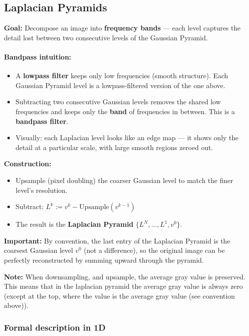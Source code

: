\documentclass{article}
\begin{document}
\subsection{Laplacian Pyramids}
\label{subsec:laplacian-pyramid}
\textbf{Goal:} Decompose an image into \textbf{frequency bands} — each level
captures the detail lost between two consecutive levels of the Gaussian Pyramid.

\paragraph{Bandpass intuition:}
\begin{itemize}
  \item A \textbf{lowpass filter} keeps only low frequencies (smooth structure).
        Each Gaussian Pyramid level is a lowpass-filtered version of the one above.
  \item Subtracting two consecutive Gaussian levels removes the shared low
        frequencies and keeps only the \textbf{band} of frequencies in between.
        This is a \textbf{bandpass filter}.
  \item Visually: each Laplacian level looks like an edge map — it shows only the
        detail at a particular scale, with large smooth regions zeroed out.
\end{itemize}

\textbf{Construction:}
\begin{itemize}
  \item Upsample (pixel doubling) the coarser Gaussian level to match the finer
        level's resolution.
  \item Subtract: $L^k := v^k - \mathrm{Upsample}(v^{k-1})$
  \item The result is the \textbf{Laplacian Pyramid} $\{L^N, \dots, L^1, v^0\}$.
\end{itemize}
\textbf{Important:} By convention, the last entry of the Laplacian Pyramid is the
coarsest Gaussian level $v^0$ (not a difference), so the original image can be
perfectly reconstructed by summing upward through the pyramid.

\textbf{Note: } When downsampling, and upsample, the average gray value is preserved. This means that in the laplacian pyramid the average gray value is always zero (except at the top, where the value is the average gray value (see convention above)).

\subsubsection{Formal description in 1D}
\end{document}
